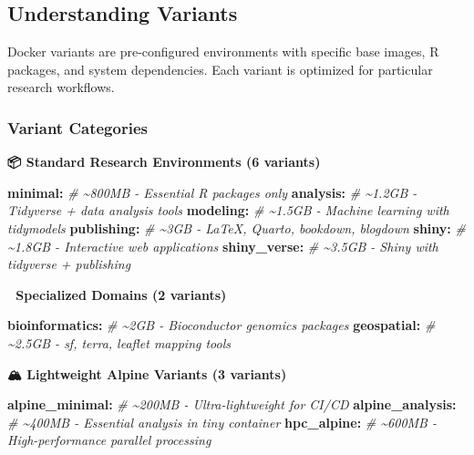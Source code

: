 \documentclass[
]{article}
\newenvironment{Shaded}{\begin{snugshade}}{\end{snugshade}}
\newcommand{\CommentTok}[1]{\textcolor[rgb]{0.56,0.35,0.01}{\textit{#1}}}
\newcommand{\FunctionTok}[1]{\textcolor[rgb]{0.13,0.29,0.53}{\textbf{#1}}}
\newcommand{\KeywordTok}[1]{\textcolor[rgb]{0.13,0.29,0.53}{\textbf{#1}}}
\begin{document}
\subsection{Understanding Variants}\label{understanding-variants}

Docker variants are pre-configured environments with specific base
images, R packages, and system dependencies. Each variant is optimized
for particular research workflows.

\subsubsection{Variant Categories}\label{variant-categories}

\textbf{📦 Standard Research Environments (6 variants)}

\begin{Shaded}
\begin{Highlighting}[]
\FunctionTok{minimal}\KeywordTok{:}\CommentTok{          \# \textasciitilde{}800MB  {-} Essential R packages only}
\FunctionTok{analysis}\KeywordTok{:}\CommentTok{         \# \textasciitilde{}1.2GB  {-} Tidyverse + data analysis tools}
\FunctionTok{modeling}\KeywordTok{:}\CommentTok{         \# \textasciitilde{}1.5GB  {-} Machine learning with tidymodels}
\FunctionTok{publishing}\KeywordTok{:}\CommentTok{       \# \textasciitilde{}3GB    {-} LaTeX, Quarto, bookdown, blogdown}
\FunctionTok{shiny}\KeywordTok{:}\CommentTok{            \# \textasciitilde{}1.8GB  {-} Interactive web applications}
\FunctionTok{shiny\_verse}\KeywordTok{:}\CommentTok{      \# \textasciitilde{}3.5GB  {-} Shiny with tidyverse + publishing}
\end{Highlighting}
\end{Shaded}

\textbf{🔬 Specialized Domains (2 variants)}

\begin{Shaded}
\begin{Highlighting}[]
\FunctionTok{bioinformatics}\KeywordTok{:}\CommentTok{   \# \textasciitilde{}2GB    {-} Bioconductor genomics packages}
\FunctionTok{geospatial}\KeywordTok{:}\CommentTok{       \# \textasciitilde{}2.5GB  {-} sf, terra, leaflet mapping tools}
\end{Highlighting}
\end{Shaded}

\textbf{🏔 Lightweight Alpine Variants (3 variants)}

\begin{Shaded}
\begin{Highlighting}[]
\FunctionTok{alpine\_minimal}\KeywordTok{:}\CommentTok{   \# \textasciitilde{}200MB  {-} Ultra{-}lightweight for CI/CD}
\FunctionTok{alpine\_analysis}\KeywordTok{:}\CommentTok{  \# \textasciitilde{}400MB  {-} Essential analysis in tiny container}
\FunctionTok{hpc\_alpine}\KeywordTok{:}\CommentTok{       \# \textasciitilde{}600MB  {-} High{-}performance parallel processing}
\end{Highlighting}
\end{Shaded}
\end{document}
